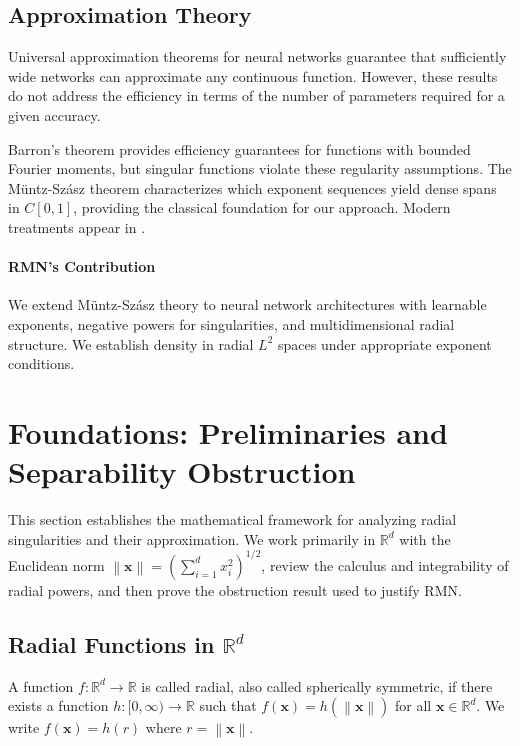 \documentclass[twoside,11pt]{article}
\newcommand{\R}{\mathbb{R}}
\newcommand{\bx}{\bm{x}}
\newcommand{\norm}[1]{\left\|#1\right\|}
\begin{document}
\subsection{Approximation Theory}

Universal approximation theorems for neural networks \citep{cybenko1989approximation, hornik1989multilayer} guarantee that sufficiently wide networks can approximate any continuous function. However, these results do not address the efficiency in terms of the number of parameters required for a given accuracy.

Barron's theorem \citep{barron1993universal} provides efficiency guarantees for functions with bounded Fourier moments, but singular functions violate these regularity assumptions. The Müntz-Szász theorem \citep{muntz1914, szasz1916} characterizes which exponent sequences yield dense spans in $C[0,1]$, providing the classical foundation for our approach. Modern treatments appear in \citet{borwein1995polynomials}.

\paragraph{RMN's Contribution} We extend Müntz-Szász theory to neural network architectures with learnable exponents, negative powers for singularities, and multidimensional radial structure. We establish density in radial $L^2$ spaces under appropriate exponent conditions.

\section{Foundations: Preliminaries and Separability Obstruction}
\label{sec:preliminaries}

This section establishes the mathematical framework for analyzing radial singularities and their approximation. We work primarily in $\R^d$ with the Euclidean norm $\norm{\bx} = (\sum_{i=1}^d x_i^2)^{1/2}$, review the calculus and integrability of radial powers, and then prove the obstruction result used to justify RMN.

\subsection{Radial Functions in \texorpdfstring{$\R^d$}{Rd}}
\label{subsec:radial_functions}

\begin{definition}
	A function $f: \R^d \to \R$ is called radial, also called spherically symmetric, if there exists a function $h: [0, \infty) \to \R$ such that $f(\bx) = h(\norm{\bx})$ for all $\bx \in \R^d$. We write $f(\bx) = h(r)$ where $r = \norm{\bx}$.
\end{definition}
\end{document}
